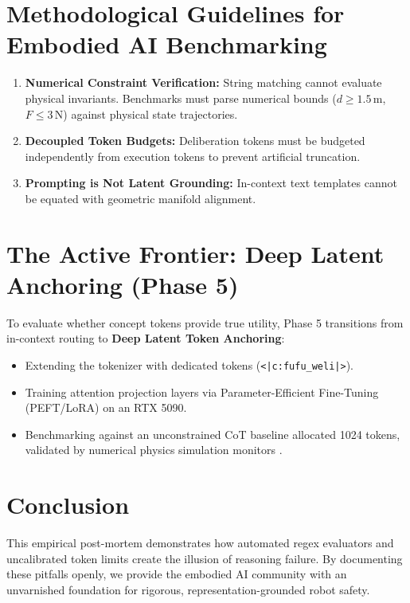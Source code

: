 \documentclass{article}
\begin{document}
\section{Methodological Guidelines for Embodied AI Benchmarking}
\begin{enumerate}
    \item \textbf{Numerical Constraint Verification:} String matching cannot evaluate physical invariants. Benchmarks must parse numerical bounds ($d \ge 1.5$\,m, $F \le 3$\,N) against physical state trajectories.
    \item \textbf{Decoupled Token Budgets:} Deliberation tokens must be budgeted independently from execution tokens to prevent artificial truncation.
    \item \textbf{Prompting is Not Latent Grounding:} In-context text templates cannot be equated with geometric manifold alignment.
\end{enumerate}

\section{The Active Frontier: Deep Latent Anchoring (Phase 5)}
To evaluate whether concept tokens provide true utility, Phase 5 transitions from in-context routing to \textbf{Deep Latent Token Anchoring}:
\begin{itemize}
    \item Extending the tokenizer with dedicated tokens (\texttt{<|c:fufu\_weli|>}).
    \item Training attention projection layers via Parameter-Efficient Fine-Tuning (PEFT/LoRA) on an RTX 5090.
    \item Benchmarking against an unconstrained CoT baseline allocated 1024 tokens, validated by numerical physics simulation monitors \cite{zhao2023safetychip}.
\end{itemize}

\section{Conclusion}
This empirical post-mortem demonstrates how automated regex evaluators and uncalibrated token limits create the illusion of reasoning failure. By documenting these pitfalls openly, we provide the embodied AI community with an unvarnished foundation for rigorous, representation-grounded robot safety.



\end{document}
